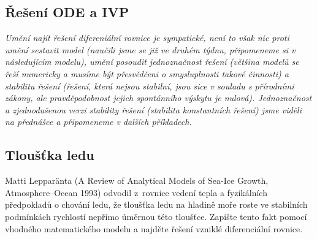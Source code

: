 \stranka

\subsection{Řešení ODE a IVP} 


\textit{Umění najít řešení difereniální rovnice je sympatické, není to však nic proti umění sestavit model (naučili jsme se již ve druhém týdnu, připomeneme si v následujícím modelu), umění posoudit jednoznačnost řešení (většina modelů se řeší numericky a musíme být přesvědčeni o smysluplnosti takové činnosti) a  stabilitu řešení (řešení, která nejsou stabilní, jsou sice v souladu s přírodními zákony, ale pravděpodobnost jejich spontánního výskytu je nulová). Jednoznačnost a zjednodušenou verzi stability řešení (stabilita konstantních řešení) jsme viděli na přednášce a připomeneme v dalších příkladech.}

\stranka

\subsection{Tloušťka ledu}

Matti Leppar\"anta (A Review of Analytical Models of Sea-Ice Growth,
Atmosphere--Ocean 1993) odvodil z~rovnice vedení tepla a fyzikálních
předpokladů o chování ledu, že tloušťka ledu na hladině moře roste ve
stabilních podmínkách rychlostí nepřímo úměrnou této tloušťce. Zapište
tento fakt pomocí vhodného matematického modelu a najděte řešení
vzniklé diferenciální rovnice.



